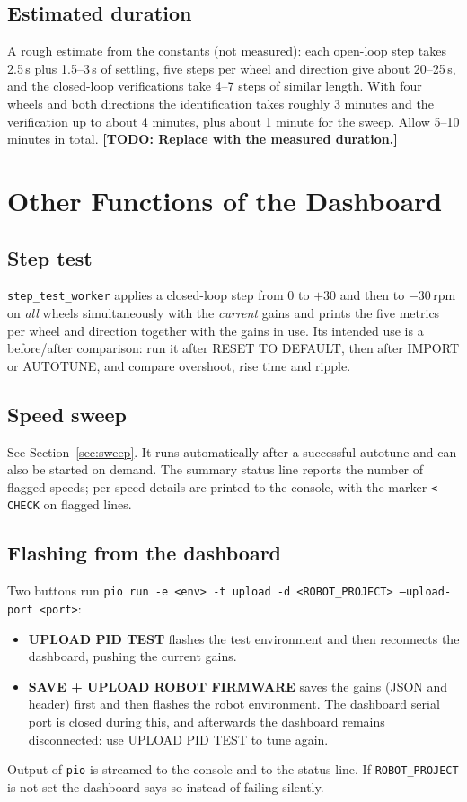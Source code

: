 \documentclass[11pt,a4paper]{report}
\newcommand{\code}[1]{\texttt{#1}}
\newcommand{\rpm}{\,\mathrm{rpm}}
\newcommand{\todo}[1]{\textcolor{warnred}{\textbf{[TODO: #1]}}}
\begin{document}
\section{Estimated duration}
A rough estimate from the constants (not measured): each open-loop step takes 2.5\,s plus 1.5--3\,s of settling, five steps per wheel and direction give about 20--25\,s, and the closed-loop verifications take 4--7 steps of similar length. With four wheels and both directions the identification takes roughly 3 minutes and the verification up to about 4 minutes, plus about 1 minute for the sweep. Allow 5--10 minutes in total. \todo{Replace with the measured duration.}

\chapter{Other Functions of the Dashboard}

\section{Step test}
\code{step\_test\_worker} applies a closed-loop step from 0 to $+30$ and then to $-30\rpm$ on \emph{all} wheels simultaneously with the \emph{current} gains and prints the five metrics per wheel and direction together with the gains in use. Its intended use is a before/after comparison: run it after RESET TO DEFAULT, then after IMPORT or AUTOTUNE, and compare overshoot, rise time and ripple.

\section{Speed sweep}
See Section~\ref{sec:sweep}. It runs automatically after a successful autotune and can also be started on demand. The summary status line reports the number of flagged speeds; per-speed details are printed to the console, with the marker \code{<-- CHECK} on flagged lines.

\section{Flashing from the dashboard}
Two buttons run \code{pio run -e <env> -t upload -d <ROBOT\_PROJECT> --upload-port <port>}:
\begin{itemize}[noitemsep]
  \item \textbf{UPLOAD PID TEST} flashes the test environment and then reconnects the dashboard, pushing the current gains.
  \item \textbf{SAVE + UPLOAD ROBOT FIRMWARE} saves the gains (JSON and header) first and then flashes the robot environment. The dashboard serial port is closed during this, and afterwards the dashboard remains disconnected: use UPLOAD PID TEST to tune again.
\end{itemize}
Output of \code{pio} is streamed to the console and to the status line. If \code{ROBOT\_PROJECT} is not set the dashboard says so instead of failing silently.
\end{document}

